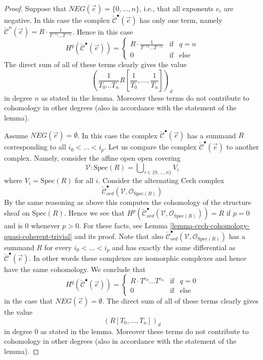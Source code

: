 \begin{proof}
\medskip\noindent
Suppose that $NEG(\vec{e}) = \{0, \ldots, n\}$, i.e., that all
exponents $e_i$ are negative.
In this case the complex $\check{\mathcal{C}}^\bullet(\vec{e})$ has
only one term, namely $\check{\mathcal{C}}^n(\vec{e}) = 
R \cdot \frac{1}{T^{-e_0} \ldots T^{-e_n}}$. Hence in this
case
$$
H^q(\check{\mathcal{C}}^\bullet(\vec{e})) =
\left\{
\begin{matrix}
R \cdot \frac{1}{T^{-e_0} \ldots T^{-e_n}} & \text{if} & q = n \\
0 & \text{if} & \text{else}
\end{matrix}
\right.
$$
The direct sum of all of these terms clearly gives the value
$$
\left(\frac{1}{T_0 \ldots T_n} R[\frac{1}{T_0}, \ldots, \frac{1}{T_n}]\right)_d
$$
in degree $n$ as stated in the lemma. Moreover these terms do not contribute
to cohomology in other degrees (also in accordance with the statement of the
lemma).

\medskip\noindent
Assume $NEG(\vec{e}) = \emptyset$. In this case the complex
$\check{\mathcal{C}}^\bullet(\vec{e})$ has a summand $R$ corresponding
to all $i_0 < \ldots < i_p$.
Let us compare the complex $\check{\mathcal{C}}^\bullet(\vec{e})$
to another complex. Namely, consider the affine open open covering
$$
\mathcal{V} : \text{Spec}(R) = \bigcup\nolimits_{i \in \{0, \ldots, n\}} V_i
$$
where $V_i = \text{Spec}(R)$ for all $i$. Consider the alternating
Cech complex
$$
\check{\mathcal{C}}_{ord}^\bullet(\mathcal{V}, \mathcal{O}_{\text{Spec}(R)})
$$
By the same reasoning as above this computes the cohomology of the
structure sheaf on $\text{Spec}(R)$. Hence we see that
$H^p(
\check{\mathcal{C}}_{ord}^\bullet(\mathcal{V}, \mathcal{O}_{\text{Spec}(R)})
) = R$ if $p = 0$ and is $0$ whenever $p > 0$.
For these facts, see
Lemma \ref{lemma-cech-cohomology-quasi-coherent-trivial} and its proof.
Note that also
$\check{\mathcal{C}}_{ord}^\bullet(\mathcal{V}, \mathcal{O}_{\text{Spec}(R)})$
has a summand $R$ for every $i_0 < \ldots < i_p$ and has exactly the same
differential as $\check{\mathcal{C}}^\bullet(\vec{e})$. In other words
these complexes are isomorphic complexes and hence have the same cohomology.
We conclude that
$$
H^q(\check{\mathcal{C}}^\bullet(\vec{e})) =
\left\{
\begin{matrix}
R \cdot T^{e_0} \ldots T^{e_n} & \text{if} & q = 0 \\
0 & \text{if} & \text{else}
\end{matrix}
\right.
$$
in the case that $NEG(\vec{e}) = \emptyset$.
The direct sum of all of these terms clearly gives the value
$$
(R[T_0, \ldots, T_n])_d
$$
in degree $0$ as stated in the lemma. Moreover these terms do not contribute
to cohomology in other degrees (also in accordance with the statement of the
lemma).


\end{proof}
